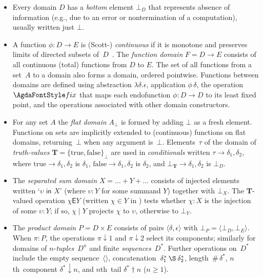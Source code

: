 \begin{itemize}
\item
  Every domain \(D\) has a \emph{bottom} element \(\bot_D\) that
  represents absence of information (e.g., due to an error or
  nontermination of a computation), usually written just \(\bot\).
\item
  A function \(\phi : D \to E\) is (Scott-) \emph{continuous} if it is
  monotone and preserves limits of directed subsets
  of~\(D\)~\cite{Abramsky1995DT}.
  The \emph{function domain} \(F = D \to E\) consists of all continuous
  (total) functions from \(D\) to \(E\). The set of all functions from a
  set~\(A\) to a domain also forms a domain, ordered pointwise.
  Functions between domains are defined using abstraction
  \(\lambda \delta.\epsilon\), application \(\phi\,\delta\), the
  operation \(\AgdaRef{fix}\) that maps each endofunction
  \(\phi : D \to D\) to its least fixed point, and the operations
  associated with other domain constructors.
\item
  For any set \(A\) the \emph{flat domain} \(A_\bot\) is formed by
  adding \(\bot\) as a fresh element. Functions on sets are implicitly
  extended to (continuous) functions on flat domains, returning~\(\bot\)
  when any argument is~\(\bot\). Elements~\(\tau\) of the domain of
  \emph{truth-values}
  \(\textbf{T} = \{ \text{true}, \text{false} \}_\bot\) are used in
  \emph{conditionals} written \(\tau \to \delta_1, \delta_2\), where
  \(\text{true} \to \delta_1, \delta_2\) is \(\delta_1\),
  \(\text{false} \to \delta_1, \delta_2\) is \(\delta_2\), and
  \(\bot_{\textbf{T}} \to \delta_1, \delta_2\) is \(\bot_D\).
\item
  The \emph{separated sum domain} \(X = \ldots + Y + \ldots\) consists
  of injected elements written `\(\upsilon \textsf{ in } X\)' (where
  \(\upsilon : Y\) for some summand \(Y\)) together with \(\bot_X\). The
  \(\textbf{T}\)-valued operation \(\chi \mathbin{\textsf{E}} Y\)
  (written \(\chi \in Y\) in
  \cite{Scheme}) tests whether
  \(\chi : X\) is the injection of some \(\upsilon : Y\); if so,
  \(\chi \mid Y\) projects \(\chi\) to \(\upsilon\), otherwise to
  \(\bot_Y\).
\item
  The \emph{product domain} \(P = D \times E\) consists of pairs
  \(\langle \delta, \epsilon \rangle\) with
  \(\bot_P = \langle \bot_D, \bot_E \rangle\). When \(\pi : P\), the
  operations \(\pi \downarrow 1\) and \(\pi \downarrow 2\) select its
  components; similarly for domains of \(n\)-\emph{tuples}~\(D^n\) and
  finite \emph{sequences}~\(D^*\). Further operations on~\(D^*\) include
  the empty sequence~\(\langle \rangle\),
  concatenation~\(\delta^*_1 \mathbin{\S} \delta^*_2\),
  length~\(\text{\#}\,\delta^*\), \(n\)th~component
  \(\delta^* \downarrow n\), and \(n\)th~tail
  \(\delta^* \mathbin{\dagger} n\) (\(n \geq 1\)).
\end{itemize}

